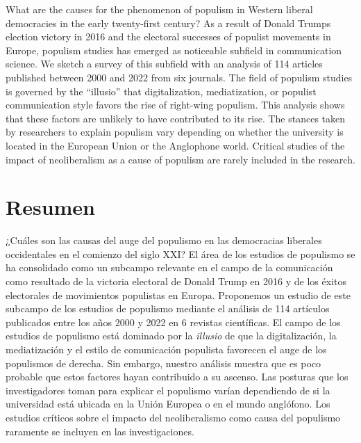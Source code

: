 \documentclass{tufte-handout}
\begin{document}
\begin{titlepage}
What are the causes for the phenomenon of populism in Western liberal
democracies in the early twenty-first century? As a result of Donald
Trump\textquotesingle s election victory in 2016 and the electoral
successes of populist movements in Europe, populism studies has emerged
as noticeable subfield in communication science. We sketch a survey of
this subfield with an analysis of 114 articles published between 2000
and 2022 from six journals. The field of populism studies is governed by
the ``illusio'' that digitalization, mediatization, or populist
communication style favors the rise of right-wing populism. This
analysis shows that these factors are unlikely to have contributed to
its rise. The stances taken by researchers to explain populism vary
depending on whether the university is located in the European Union or
the Anglophone world. Critical studies of the impact of neoliberalism as
a cause of populism are rarely included in the research.

\hypertarget{resumen}{%
\section{Resumen}\label{resumen}}

¿Cuáles son las causas del auge del populismo en las democracias liberales occidentales en el comienzo del siglo XXI? El área de los estudios de populismo se ha consolidado como un subcampo relevante en el campo de la comunicación como resultado de la victoria electoral de Donald Trump en 2016 y de los éxitos electorales de movimientos populistas en Europa. Proponemos un estudio de este subcampo de los estudios de populismo mediante el análisis de 114 artículos publicados entre los años 2000 y 2022 en 6 revistas científicas. El campo de los estudios de populismo está dominado por la \emph{illusio} de que la digitalización, la mediatización y el estilo de comunicación populista favorecen el auge de los populismos de derecha. Sin embargo, nuestro análisis muestra que es poco probable que estos factores hayan contribuido a su ascenso. Las posturas que los investigadores toman para explicar el populismo varían dependiendo de si la universidad está ubicada en la Unión Europea o en el mundo anglófono. Los estudios críticos sobre el impacto del neoliberalismo como causa del populismo raramente se incluyen en las investigaciones.


\enlargethispage{2\baselineskip}



 \end{titlepage}
\end{document}
